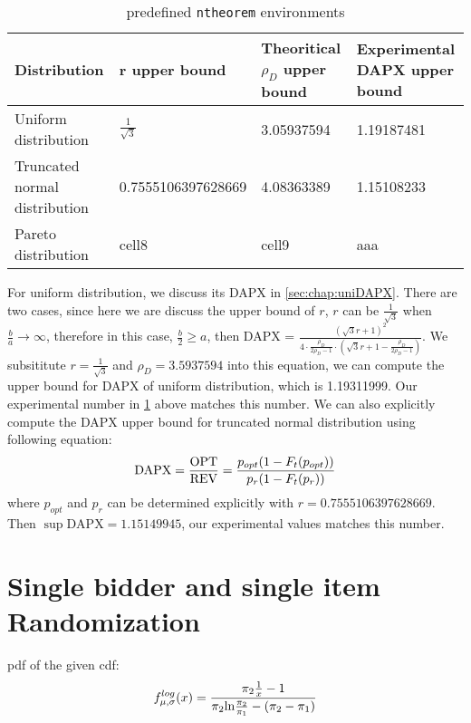 \begin{center}
	\begin{table}[hbt]
		\begin{tabular}{ | m{3cm} | m{3cm}| m{3cm} |m{4cm}|  } 
		\hline
		\textbf{Distribution}	&	\textbf{r upper bound}  & \textbf{Theoritical $\rho_D$ upper bound} & 	\textbf{Experimental DAPX upper bound}  \\ 
		\hline
		Uniform distribution&$\frac{1}{\sqrt{3}}$& 3.05937594 & 1.19187481 \\ 
		\hline
		Truncated normal distribution & 0.7555106397628669 & 4.08363389& 1.15108233 \\ 
		\hline
		 Pareto distribution& cell8 & cell9& aaa \\
		\hline
		\end{tabular}
		\caption{predefined \texttt{ntheorem} environments}
		\label{tab:dapxbound}
	\end{table}
\end{center}

For uniform distribution, we discuss its DAPX in \cref{sec:chap:uniDAPX}. There are two cases, since here we are discuss the upper bound of $r$, $r$ can be $\frac{1}{\sqrt{3}}$ when $\frac{b}{a} \rightarrow \infty$, therefore in this case, $\frac{b}{2} \geqslant a$, then DAPX =  $\frac{ ( \sqrt{3}r +1)^{2}}{4 \cdot \frac{ \rho_{D}}{2\rho_{D}-1}\cdot( \sqrt{3}r+ 1-\frac{\rho_{D}}{2\rho_{D}-1})}$. We subsititute $r = \frac{1}{\sqrt{3}}$ and $\rho_D = 3.5937594$ into this equation, we can compute the upper bound for DAPX of uniform distribution, which is 1.19311999. Our experimental number in \cref{tab:dapxbound} above matches this number. We can also explicitly compute the DAPX upper bound for truncated normal distribution using following equation:
\begin{equation}\notag
\text{DAPX} = \frac{\text{OPT}}{\text{REV}} =\frac{p_{opt}(1-F_t(p_{opt}))} {p_r(1-F_t(p_{r}))} 	
\end{equation} 
where $p_{opt}$ and $p_r$ can be determined explicitly with $r = 0.7555106397628669$. Then $\sup \text{DAPX} = 1.15149945$, our experimental values matches this number. 






\chapter{Single bidder and single item Randomization}

pdf of the given cdf: 
\begin{equation}\notag
	f^{log}_{\mu,\sigma} (x) =  \frac{\pi_2\frac{1}{x} -1}{\pi_2 \text{ln} \frac{\pi_2}{\pi_1} - (\pi_2-\pi_1)}
\end{equation} 

